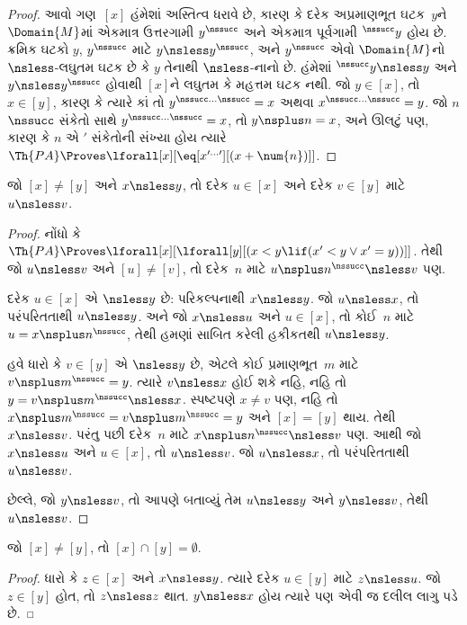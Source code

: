 \begin{proof}
આવો ગણ~$[x]$ હંમેશાં અસ્તિત્વ ધરાવે છે, કારણ કે દરેક અપ્રમાણભૂત
ઘટક~$y$ને $\Domain{M}$માં એકમાત્ર ઉત્તરગામી $y^\nssucc$ અને
એકમાત્ર પૂર્વગામી $^\nssucc y$ હોય છે. ક્રમિક ઘટકો $y$,
$y^\nssucc$ માટે
$y\nsless y^\nssucc$, અને $y^\nssucc$ એવો $\Domain{M}$નો
$\nsless$-લઘુતમ ઘટક છે કે $y$ તેનાથી $\nsless$-નાનો છે.
હંમેશાં $^\nssucc y\nsless y$ અને $y\nsless y^\nssucc$ હોવાથી
$[x]$ને લઘુતમ કે મહત્તમ ઘટક નથી. જો $y\in[x]$, તો
$x\in[y]$, કારણ કે ત્યારે કાં તો $y^{\nssucc\dots\nssucc}=x$ અથવા
$x^{\nssucc\dots\nssucc}=y$. જો $n$ $\nssucc$ સંકેતો સાથે
$y^{\nssucc\dots\nssucc}=x$, તો $y\nsplus n=x$, અને ઊલટું પણ,
કારણ કે $n$ એ $\prime$ સંકેતોની સંખ્યા હોય ત્યારે
$\Th{PA}\Proves\lforall[x][\eq[x^{\prime\dots\prime}][(x+\num{n})]]$.
\end{proof}

\begin{prop}
જો $[x]\neq[y]$ અને $x\nsless y$, તો દરેક $u\in[x]$ અને દરેક
$v\in[y]$ માટે $u\nsless v$.
\end{prop}

\begin{proof}
નોંધો કે
$\Th{PA}\Proves\lforall[x][\lforall[y][(x<y\lif(x'<y\lor x'=y))]]$.
તેથી જો $u\nsless v$ અને $[u]\neq[v]$, તો દરેક~$n$ માટે
$u\nsplus n^\nssucc\nsless v$ પણ.

દરેક $u\in[x]$ એ $\nsless y$ છે: પરિકલ્પનાથી $x\nsless y$. જો
$u\nsless x$, તો પરંપરિતતાથી $u\nsless y$. અને જો $x\nsless u$ અને
$u\in[x]$, તો કોઈ~$n$ માટે $u=x\nsplus n^\nssucc$, તેથી હમણાં સાબિત
કરેલી હકીકતથી $u\nsless y$.

હવે ધારો કે $v\in[y]$ એ $\nsless y$ છે, એટલે કોઈ પ્રમાણભૂત~$m$ માટે
$v\nsplus m^\nssucc=y$. ત્યારે $v\nsless x$ હોઈ શકે નહિ, નહિ તો
$y=v\nsplus m^\nssucc\nsless x$. સ્પષ્ટપણે $x\neq v$ પણ, નહિ તો
$x\nsplus m^\nssucc=v\nsplus m^\nssucc=y$ અને $[x]=[y]$ થાય. તેથી
$x\nsless v$. પરંતુ પછી દરેક~$n$ માટે
$x\nsplus n^\nssucc\nsless v$ પણ. આથી જો $x\nsless u$ અને
$u\in[x]$, તો $u\nsless v$. જો $u\nsless x$, તો પરંપરિતતાથી
$u\nsless v$.

છેલ્લે, જો $y\nsless v$, તો આપણે બતાવ્યું તેમ $u\nsless y$ અને
$y\nsless v$, તેથી $u\nsless v$.
\end{proof}

\begin{cor}
જો $[x]\neq[y]$, તો $[x]\cap[y]=\emptyset$.
\end{cor}

\begin{proof}
ધારો કે $z\in[x]$ અને $x\nsless y$. ત્યારે દરેક $u\in[y]$ માટે
$z\nsless u$. જો $z\in[y]$ હોત, તો $z\nsless z$ થાત. $y\nsless x$
હોય ત્યારે પણ એવી જ દલીલ લાગુ પડે છે.
\end{proof}

